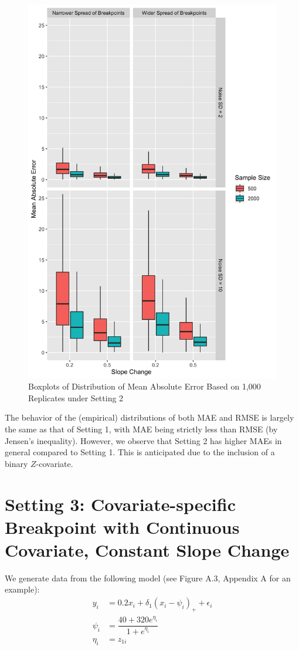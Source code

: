 \documentclass [12pt, proquest] {uwthesis}[2016/11/22]
\begin{document}
\begin{figure}
    \centering
    \includegraphics[width = 5.5 in]{Plot4_2.png}
    \caption{Boxplots of Distribution of Mean Absolute Error Based on 1,000 Replicates under Setting 2}
\end{figure}

The behavior of the (empirical) distributions of both MAE and RMSE is largely the same as that of Setting 1, with MAE being strictly less than RMSE (by Jensen's inequality). However, we observe that Setting 2 has higher MAEs in general compared to Setting 1. This is anticipated due to the inclusion of a binary $Z$-covariate.

\section{Setting 3: Covariate-specific Breakpoint with Continuous Covariate, Constant Slope Change}
We generate data from the following model (see Figure A.3, Appendix A for an example):
\begin{align*}
    y_i &= 0.2 x_i + \delta_1 (x_i - \psi_i)_+ + \epsilon_i \\
    \psi_i &= \dfrac{40 + 320 e^{\eta_i}}{1 + e^{\eta_i}} \\
    \eta_i &= z_{1i}
\end{align*}
\end{document}
